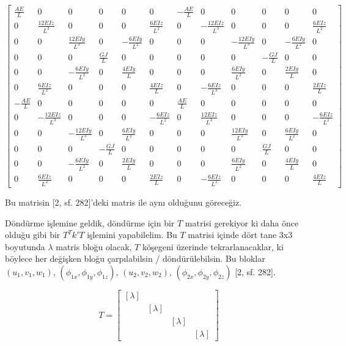 \documentclass[12pt,fleqn]{article}\usepackage{../../common}
\begin{document}
$$
\left[\begin{array}{cccccccccccc}\frac{A E}{L} & 0 & 0 & 0 & 0 & 0 & - \frac{A E}{L} & 0 & 0 & 0 & 0 & 0\\0 & \frac{12 E Iz}{L^{3}} & 0 & 0 & 0 & \frac{6 E Iz}{L^{2}} & 0 & - \frac{12 E Iz}{L^{3}} & 0 & 0 & 0 & \frac{6 E Iz}{L^{2}}\\0 & 0 & \frac{12 E Iy}{L^{3}} & 0 & - \frac{6 E Iy}{L^{2}} & 0 & 0 & 0 & - \frac{12 E Iy}{L^{3}} & 0 & - \frac{6 E Iy}{L^{2}} & 0\\0 & 0 & 0 & \frac{G J}{L} & 0 & 0 & 0 & 0 & 0 & - \frac{G J}{L} & 0 & 0\\0 & 0 & - \frac{6 E Iy}{L^{2}} & 0 & \frac{4 E Iy}{L} & 0 & 0 & 0 & \frac{6 E Iy}{L^{2}} & 0 & \frac{2 E Iy}{L} & 0\\0 & \frac{6 E Iz}{L^{2}} & 0 & 0 & 0 & \frac{4 E Iz}{L} & 0 & - \frac{6 E Iz}{L^{2}} & 0 & 0 & 0 & \frac{2 E Iz}{L}\\- \frac{A E}{L} & 0 & 0 & 0 & 0 & 0 & \frac{A E}{L} & 0 & 0 & 0 & 0 & 0\\0 & - \frac{12 E Iz}{L^{3}} & 0 & 0 & 0 & - \frac{6 E Iz}{L^{2}} & 0 & \frac{12 E Iz}{L^{3}} & 0 & 0 & 0 & - \frac{6 E Iz}{L^{2}}\\0 & 0 & - \frac{12 E Iy}{L^{3}} & 0 & \frac{6 E Iy}{L^{2}} & 0 & 0 & 0 & \frac{12 E Iy}{L^{3}} & 0 & \frac{6 E Iy}{L^{2}} & 0\\0 & 0 & 0 & - \frac{G J}{L} & 0 & 0 & 0 & 0 & 0 & \frac{G J}{L} & 0 & 0\\0 & 0 & - \frac{6 E Iy}{L^{2}} & 0 & \frac{2 E Iy}{L} & 0 & 0 & 0 & \frac{6 E Iy}{L^{2}} & 0 & \frac{4 E Iy}{L} & 0\\0 & \frac{6 E Iz}{L^{2}} & 0 & 0 & 0 & \frac{2 E Iz}{L} & 0 & - \frac{6 E Iz}{L^{2}} & 0 & 0 & 0 & \frac{4 E Iz}{L}\end{array}\right]
$$

Bu matrisin [2, sf. 282]'deki matris ile aynı olduğunu göreceğiz.

Döndürme işlemine geldik, döndürme için bir $T$ matrisi gerekiyor ki daha önce
olduğu gibi bir $T^T k' T$ işlemini yapabilelim. Bu $T$ matrisi içinde dört tane
3x3 boyutunda $\lambda$ matris bloğu olacak, $T$ köşegeni üzerinde
tekrarlanacaklar, ki böylece her değişken bloğu çarpılabilsin /
döndürülebilsin. Bu bloklar $(u_1,v_1,w_1)$, $(\phi_{1x},\phi_{1y},\phi_{1z})$,
$(u_2,v_2,w_2)$, $(\phi_{2x},\phi_{2y},\phi_{2z})$ [2, sf. 282].

$$
T = \left[\begin{array}{cccc}
[\lambda] &  & & \\
 & [\lambda] & & \\
 & & [\lambda] & \\
 & & & [\lambda]
\end{array}\right]
$$
\end{document}
